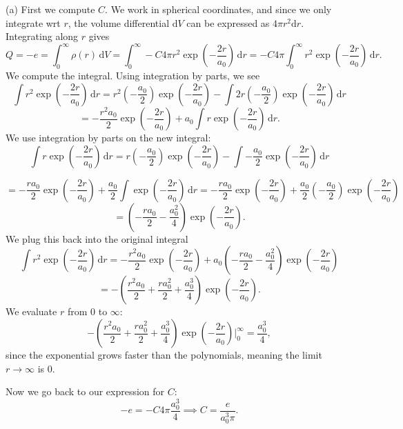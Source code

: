 \documentclass[11pt, letterpaper]{article}
\begin{document}
(a) First we compute $C$. We work in spherical coordinates, and since we only integrate wrt $r$, the volume differential $\mathrm{d} V$ can be expressed as $4\pi r^2 \mathrm{d} r$. Integrating along $r$ gives
\[
	Q=-e=\int_{0}^{\infty } \rho (r) \,\mathrm{d} V=\int_{0}^{\infty } -C4\pi r^2 \exp \left( -\frac{2r}{a_0}  \right)  \,\mathrm{d} r = -C4\pi \int_{0}^{\infty } r^2 \exp \left( -\frac{2r}{a_0}  \right)  \,\mathrm{d} r
.\]
We compute the integral. Using integration by parts, we see
\[
	\int r^2 \exp \left( -\frac{2r}{a_0}  \right)  \,\mathrm{d} r=r^2\left( -\frac{a_0}{2}  \right) \exp \left( -\frac{2r}{a_0}  \right) -\int 2r\left( -\frac{a_0}{2}  \right) \exp \left( -\frac{2r}{a_0}  \right)  \,\mathrm{d} r
\]
\[
	=-\frac{r^2a_0}{2} \exp \left( -\frac{2r}{a_0}  \right) +a_0 \int r \exp \left( -\frac{2r}{a_0}  \right)  \,\mathrm{d} r
.\]
We use integration by parts on the new integral:
\[
	\int r \exp \left( -\frac{2r}{a_0}  \right)  \,\mathrm{d} r=r\left( -\frac{a_0}{2}  \right) \exp \left( -\frac{2r}{a_0}  \right) -\int-\frac{a_0}{2}  \exp \left( -\frac{2r}{a_0}  \right)  \,\mathrm{d} r
\]

\[
	=-\frac{ra_0}{2} \exp \left( -\frac{2r}{a_0}  \right) +\frac{a_0}{2} \int \exp \left( -\frac{2r}{a_0}  \right)  \,\mathrm{d} r=-\frac{ra_0}{2} \exp \left( -\frac{2r}{a_0}  \right) +\frac{a_0}{2} \left( -\frac{a_0}{2}  \right) \exp \left( -\frac{2r}{a_0}  \right) 
\]
\[
	=\left( -\frac{ra_0}{2} -\frac{a_0^2}{4}  \right) \exp \left( -\frac{2r}{a_0}  \right) 
.\]
We plug this back into the original integral
\[
	\int r^2 \exp \left( -\frac{2r}{a_0}  \right)  \,\mathrm{d} r=-\frac{r^2a_0}{2} \exp \left( -\frac{2r}{a_0}  \right) +a_0\left( -\frac{ra_0}{2} -\frac{a_0^2}{4}  \right) \exp \left( -\frac{2r}{a_0}  \right) 
\]
\[
	=-\left( \frac{r^2a_0}{2} +\frac{ra^2_0}{2} +\frac{a_0^3}{4}  \right) \exp \left( -\frac{2r}{a_0}  \right) 
.\]
We evaluate $r$ from $0$ to $\infty $:
\[
	-\left( \frac{r^2a_0}{2} +\frac{ra^2_0}{2} +\frac{a_0^3}{4}  \right) \exp \left( -\frac{2r}{a_0}  \right) \bigg|_0^{\infty } =\frac{a_0^3}{4} ,
\]
since the exponential grows faster than the polynomials, meaning the limit $r\to \infty $ is 0.

Now we go back to our expression for $C$:
\[
	-e=-C4\pi \frac{a_0^3}{4} \implies C=\frac{e}{a_0^3\pi } 
.\]
\end{document}
